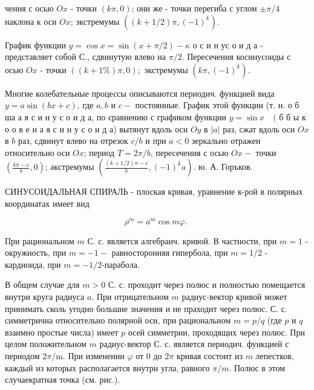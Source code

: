 \documentclass[10pt]{article}
\begin{document}
чения с осью $O x$ - точки $(k \pi, 0)$; они же - точки перегиба с углом $\pm \pi / 4$ наклона к оси $O x$; экстремумы $\left((k+1 / 2) \pi,(-1)^{k}\right)$.



График функции $y=\cos x=\sin (x+\pi / 2)-\kappa$ о с и н ус о и д а - представляет собой С., сдвинутую влево на $\pi / 2$. Пересечения косинусоиды с осью $O x$ - точки $((k+1 \%) \pi, 0) ;$ экстремумы $\left(k \pi,(-1)^{k}\right)$.



Многие колебательные процессы описываются периодич. функцией вида $y=a \sin (b x+c)$, где $a, b$ и $c-$ постоянные. График этой функции (т. н. о б ша а я с и н у с о и д а, по сравнению с графиком функции $y=\sin x \quad($ б б ы к о о в е н а я с и н у с о и д а) вытянут вдоль оси $O y$ в $|a|$ раз, сжат вдоль оси $O x$ в $b$ раз, сдвинут влево на отрезок $c / b$ и при $a<0$ зеркально отражен относительно оси $O x$; период $T=2 \pi / b$, пересечения с осью $O x-$ точки $\left(\frac{k \pi-c}{b}, 0\right)$; әкстремумы $\left(\frac{(k+1 / 2) \pi-c}{b},(-1)^{k} a\right)$. ю. А. Горъков.



СИНУСОИДАЛЬНАЯ СПИРАЛЬ - плоская кривая, уравнение к-рой в полярных координатах имеет вид



\[

\rho^{m}=a^{m} \cos m \varphi \text {. }

\]



При рациональном $m$ С. с. является алгебраич. кривой. В частности, при $m=1$ - окружность, при $m=-1-$ равносторонняя гипербола, при $m=1 / 2$ - кардиоида, при $m=-1 / 2$-парабола.



В общем случае для $m>0$ С. с. проходит через полюс и полностью помещается внутри круга радиуса $a$. При отрицательном $m$ радиус-вектор кривой может принимать сколь угодно большие значения и не праходит через полюс. С. с. симметрична относительно полярной оси, при рациональном $m=p / q$ (где $p$ и $q$ взаимно простые числа) имеет $p$ осей симметрии, проходящих через полюс. При целом положительном $m$ радиус-вектор С. с. является периодич. функцией с периодом $2 \pi / \mathrm{m}$. При изменении $\varphi$ от 0 до $2 \pi$ кривая состоит из $m$ лепестков, каждый из которых располагается внутри угла, равного $\pi / m$. Полюс в этом случаекратная точка (см. рис.).
\end{document}
